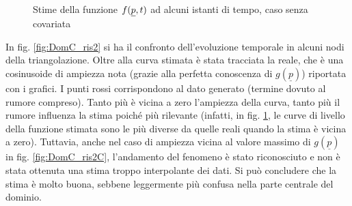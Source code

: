 \documentclass[a4paper,11pt,twoside,openright]{book}							%
\begin{document}
\begin{figure}[H]
{   }
	\caption{Stime della funzione $f(\protect\underline{p},t)$ ad alcuni istanti di tempo, caso senza covariata}
	\label{fig:DomC_ris}
\end{figure}
\newpage
In fig. \ref{fig:DomC_ris2} si ha il confronto dell'evoluzione temporale in alcuni nodi della triangolazione. Oltre alla curva stimata è stata tracciata la reale, che è una cosinusoide di ampiezza nota (grazie alla perfetta conoscenza di $g(\underline p)$) riportata con i grafici. I punti rossi corrispondono al dato generato (termine dovuto al rumore compreso). Tanto più è vicina a zero l'ampiezza della curva, tanto più il rumore influenza la stima poiché più rilevante (infatti, in fig. \ref{fig:DomC_ris}, le curve di livello della funzione stimata sono le più diverse da quelle reali quando la stima è vicina a zero). Tuttavia, anche nel caso di ampiezza vicina al valore massimo di $g(\underline p)$ in fig. \ref{fig:DomC_ris2C}, l'andamento del fenomeno è stato riconosciuto e non è stata ottenuta una stima troppo interpolante dei dati. Si può concludere che la stima è molto buona, sebbene leggermente più confusa nella parte centrale del dominio.
\end{document}
